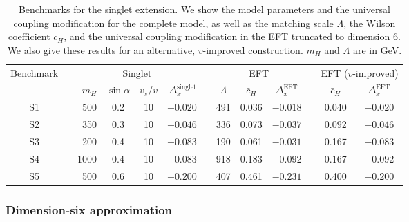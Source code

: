 \begin{table}[t] \renewcommand{\arraystretch}{1.2} \centering
    \begin{tabular}{c c rccr c ccc c cc} \toprule
\multirow{2}{*}{Benchmark} &\hspace*{1em}& \multicolumn{4}{c}{Singlet}
&\hspace*{1em}& \multicolumn{3}{c}{EFT} &\hspace*{1em}&
\multicolumn{2}{c}{EFT ($v$-improved)} \\ \cmidrule{3-6}
\cmidrule{8-10} \cmidrule{12-13} && $m_H$ & $\sin\alpha$ & $v_s/v$ &
$\Delta_x^\text{singlet}$ && $\Lambda$ & $\bar{c}_H$ &
$\Delta_x^\text{EFT}$ && $\bar{c}_H$ & $\Delta_x^\text{EFT}$\\
\midrule S1 && 500 & 0.2 & 10 & $-0.020$ && 491 & 0.036 & $-0.018$ &&
0.040 & $-0.020$ \\ S2 && 350 & 0.3 & 10 & $-0.046$ && 336 & 0.073 &
$-0.037$ && 0.092 & $-0.046$ \\ S3 && 200 & 0.4 & 10 & $-0.083$ && 190
& 0.061 & $-0.031$ && 0.167 & $-0.083$ \\ S4 && 1000 & 0.4 & 10 &
$-0.083$ && 918 & 0.183 & $-0.092$ && 0.167 & $-0.092$ \\ S5 && 500 &
0.6 & 10 & $-0.200$ && 407 & 0.461 & $-0.231$ && 0.400 & $-0.200$ \\
\bottomrule
    \end{tabular}
  \caption{Benchmarks for the singlet extension. We show the model
parameters and the universal coupling modification for the complete
model, as well as the matching scale $\Lambda$, the Wilson coefficient
$\bar{c}_H$, and the universal coupling modification in the EFT
truncated to dimension 6. We also give these results for an
alternative, $v$-improved construction. $m_H$ and $\Lambda$ are in
GeV.}
  \label{tab:singlet_benchmarks}
\end{table}


\subsubsection{Dimension-six approximation}

